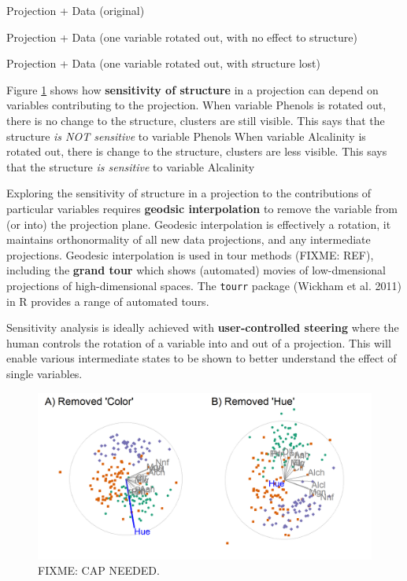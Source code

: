 \documentclass[11,]{article}
\begin{document}
Projection + Data (original)

Projection + Data (one variable rotated out, with no effect to structure)

Projection + Data (one variable rotated out, with structure lost)

Figure \ref{fig:basisStructure} shows how \textbf{sensitivity of structure} in a projection can depend on variables contributing to the projection. When variable Phenols is rotated out, there is no change to the structure, clusters are still visible. This says that the structure \emph{is NOT sensitive} to variable Phenols When variable Alcalinity is rotated out, there is change to the structure, clusters are less visible. This says that the structure \emph{is sensitive} to variable Alcalinity

Exploring the sensitivity of structure in a projection to the contributions of particular variables requires \textbf{geodsic interpolation} to remove the variable from (or into) the projection plane. Geodesic interpolation is effectively a rotation, it maintains orthonormality of all new data projections, and any intermediate projections. Geodesic interpolation is used in tour methods (FIXME: REF), including the \textbf{grand tour} which shows (automated) movies of low-dmensional projections of high-dimensional spaces. The \texttt{tourr} package (Wickham et al. 2011) in R provides a range of automated tours.

Sensitivity analysis is ideally achieved with \textbf{user-controlled steering} where the human controls the rotation of a variable into and out of a projection. This will enable various intermediate states to be shown to better understand the effect of single variables.

\begin{figure}[h]

{\centering \includegraphics[width=1\linewidth,]{./figures/basisStructureWINE} 

}

\caption{FIXME: CAP NEEDED.}\label{fig:basisStructure}
\end{figure}
\end{document}
